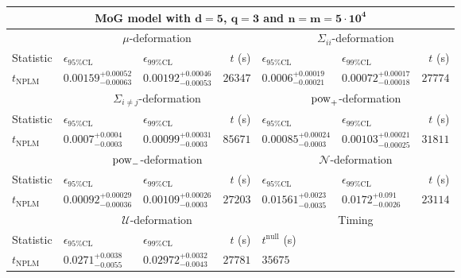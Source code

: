 \begin{tabular}{l|llr|llr}
	\toprule
	\multicolumn{7}{c}{{\bf MoG model with $\mathbf{d=5}$, $\mathbf{q=3}$ and $\mathbf{n=m=5\cdot 10^{4}}$}} \\
	\toprule
	\multicolumn{1}{c}{} & \multicolumn{3}{c}{$\mu$-deformation} & \multicolumn{3}{c}{$\Sigma_{ii}$-deformation} \\
	Statistic & $\epsilon_{95\%\mathrm{CL}}$ & $\epsilon_{99\%\mathrm{CL}}$ & $t$ (s) & $\epsilon_{95\%\mathrm{CL}}$ & $\epsilon_{99\%\mathrm{CL}}$ & $t$ (s) \\
	\midrule
	$t_{\mathrm{NPLM}}$ & $0.00159_{-0.00063}^{+0.00052}$ & $0.00192_{-0.00053}^{+0.00046}$ & $26347$ & $0.0006_{-0.00021}^{+0.00019}$ & $0.00072_{-0.00018}^{+0.00017}$ & $27774$ \\
	\toprule
	\multicolumn{1}{c}{} & \multicolumn{3}{c}{$\Sigma_{i\neq j}$-deformation} & \multicolumn{3}{c}{$\rm{pow}_{+}$-deformation} \\
	Statistic & $\epsilon_{95\%\mathrm{CL}}$ & $\epsilon_{99\%\mathrm{CL}}$ & $t$ (s) & $\epsilon_{95\%\mathrm{CL}}$ & $\epsilon_{99\%\mathrm{CL}}$ & $t$ (s) \\
	\midrule
	$t_{\mathrm{NPLM}}$ & $0.0007_{-0.0003}^{+0.0004}$ & $0.00099_{-0.0003}^{+0.00031}$ & $85671$ & $0.00085_{-0.0003}^{+0.00024}$ & $0.00103_{-0.00025}^{+0.00021}$ & $31811$ \\
	\toprule
	\multicolumn{1}{c}{} & \multicolumn{3}{c}{$\rm{pow}_{-}$-deformation} & \multicolumn{3}{c}{$\mathcal{N}$-deformation} \\
	Statistic & $\epsilon_{95\%\mathrm{CL}}$ & $\epsilon_{99\%\mathrm{CL}}$ & $t$ (s) & $\epsilon_{95\%\mathrm{CL}}$ & $\epsilon_{99\%\mathrm{CL}}$ & $t$ (s) \\
	\midrule
	$t_{\mathrm{NPLM}}$ & $0.00092_{-0.00036}^{+0.00029}$ & $0.00109_{-0.0003}^{+0.00026}$ & $27203$ & $0.01561_{-0.0035}^{+0.0023}$ & $0.0172_{-0.0026}^{+0.091}$ & $23114$ \\
	\toprule
	\multicolumn{1}{c}{} & \multicolumn{3}{c}{$\mathcal{U}$-deformation} & \multicolumn{3}{c}{Timing} \\
	Statistic & $\epsilon_{95\%\mathrm{CL}}$ & $\epsilon_{99\%\mathrm{CL}}$ & $t$ (s) & $t^{\mathrm{null}}$ (s) \\
	\midrule
	$t_{\mathrm{NPLM}}$ & $0.0271_{-0.0055}^{+0.0038}$ & $0.02972_{-0.0043}^{+0.0032}$ & $27781$ & $35675$ \\
	\bottomrule
\end{tabular}